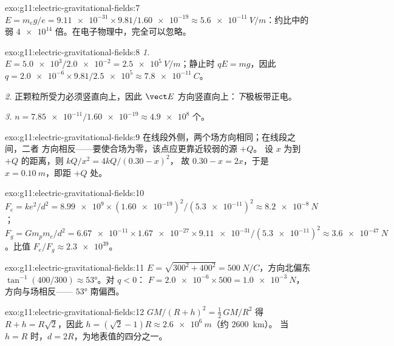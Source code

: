 \begin{solution}{exo:g11:electric-gravitational-fields:7}
$E = m_e g / e = \num{9.11e-31} \times 9.81 / \num{1.60e-19}
\approx \qty{5.6e-11}{V/m}$：约比中的
弱 $\num{4e14}$ 倍。在电子物理中，完全可以忽略。
\end{solution}

\begin{solution}{exo:g11:electric-gravitational-fields:8}
\emph{1.} $E = \num{5.0e3} / \num{2.0e-2} = \qty{2.5e5}{V/m}$；静止时
$qE = mg$，因此
$q = \num{2.0e-6} \times 9.81 / \num{2.5e5} \approx \qty{7.8e-11}{C}$。

\emph{2.} 正颗粒所受力必须竖直向上，因此 $\vect E$
方向竖直向上：\emph{下}极板带正电。

\emph{3.} $n = \num{7.85e-11} / \num{1.60e-19} \approx \num{4.9e8}$
个。
\end{solution}

\begin{solution}{exo:g11:electric-gravitational-fields:9}
在线段外侧，两个场方向相同；在线段之间，二者
方向相反——要使合场为零，该点应更靠近较弱的源 $+Q$。
设 $x$ 为到 $+Q$ 的距离，则 $kQ/x^2 = 4kQ/(0.30 - x)^2$，
故 $0.30 - x = 2x$，于是 $x = \qty{0.10}{m}$，即距 $+Q$ 处。
\end{solution}

\begin{solution}{exo:g11:electric-gravitational-fields:10}
$F_e = ke^2/d^2 = \num{8.99e9} \times (\num{1.60e-19})^2 /
(\num{5.3e-11})^2 \approx \qty{8.2e-8}{N}$；
$F_g = G m_p m_e / d^2 = \num{6.67e-11} \times \num{1.67e-27} \times
\num{9.11e-31} / (\num{5.3e-11})^2 \approx \qty{3.6e-47}{N}$。比值
$F_e / F_g \approx \num{2.3e39}$。
\end{solution}

\begin{solution}{exo:g11:electric-gravitational-fields:11}
$E = \sqrt{300^2 + 400^2} = \qty{500}{N/C}$，方向北偏东
$\tan^{-1}(400/300) \approx \ang{53}$。对 $q < 0$：
$F = \num{2.0e-6} \times 500 = \qty{1.0e-3}{N}$，方向与场相反——
$\ang{53}$ 南偏西。
\end{solution}

\begin{solution}{exo:g11:electric-gravitational-fields:12}
$GM/(R+h)^2 = \tfrac12\,GM/R^2$ 得 $R + h = R\sqrt{2}$，因此
$h = (\sqrt{2} - 1)R \approx \qty{2.6e6}{m}$（约 \qty{2600}{km}）。
当 $h = R$ 时，$d = 2R$，为地表值的四分之一。
\end{solution}

